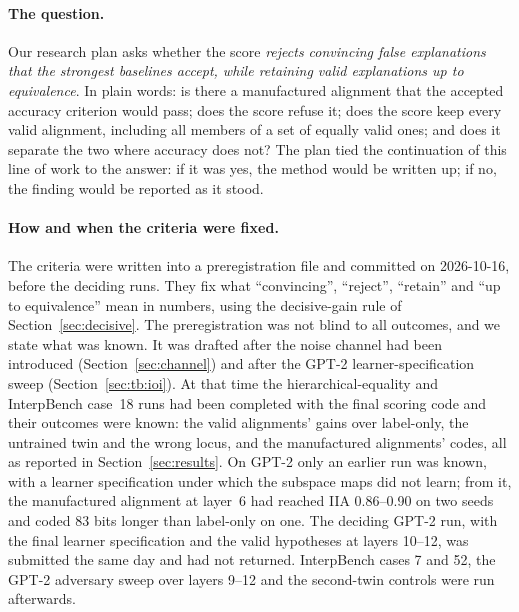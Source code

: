 \documentclass[11pt,a4paper]{article}
\begin{document}
\paragraph{The question.} Our research plan asks whether the score \emph{rejects convincing false explanations that the strongest baselines accept, while retaining valid explanations up to equivalence}. In plain words: is there a manufactured alignment that the accepted accuracy criterion would pass; does the score refuse it; does the score keep every valid alignment, including all members of a set of equally valid ones; and does it separate the two where accuracy does not? The plan tied the continuation of this line of work to the answer: if it was yes, the method would be written up; if no, the finding would be reported as it stood.

\paragraph{How and when the criteria were fixed.} The criteria were written into a preregistration file and committed on 2026-10-16, before the deciding runs. They fix what ``convincing'', ``reject'', ``retain'' and ``up to equivalence'' mean in numbers, using the decisive-gain rule of Section~\ref{sec:decisive}. The preregistration was not blind to all outcomes, and we state what was known. It was drafted after the noise channel had been introduced (Section~\ref{sec:channel}) and after the GPT-2 learner-specification sweep (Section~\ref{sec:tb:ioi}). At that time the hierarchical-equality and InterpBench case~18 runs had been completed with the final scoring code and their outcomes were known: the valid alignments' gains over label-only, the untrained twin and the wrong locus, and the manufactured alignments' codes, all as reported in Section~\ref{sec:results}. On GPT-2 only an earlier run was known, with a learner specification under which the subspace maps did not learn; from it, the manufactured alignment at layer~6 had reached IIA 0.86--0.90 on two seeds and coded 83 bits longer than label-only on one. The deciding GPT-2 run, with the final learner specification and the valid hypotheses at layers 10--12, was submitted the same day and had not returned. InterpBench cases 7 and 52, the GPT-2 adversary sweep over layers 9--12 and the second-twin controls were run afterwards.
\end{document}

